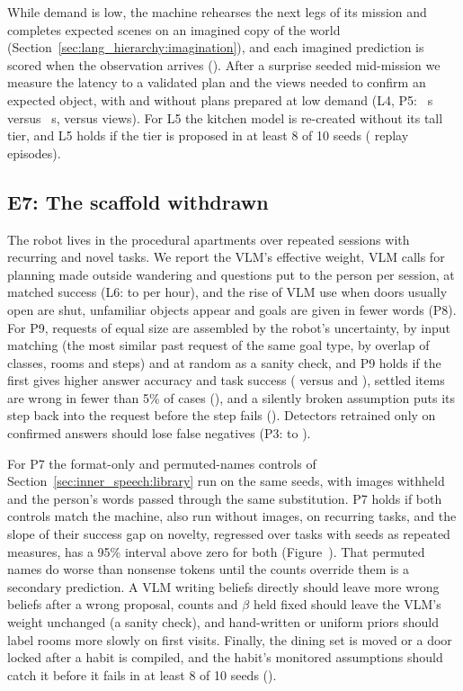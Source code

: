 While demand is low, the machine rehearses the next legs of its mission and completes expected scenes on an imagined
copy of the world (Section~\ref{sec:lang_hierarchy:imagination}), and each imagined prediction is scored when the
observation arrives (\result{--}). After a surprise seeded mid-mission we measure the latency to a validated plan and
the views needed to confirm an expected object, with and without plans prepared at low demand (L4, P5: \result{--}~s
versus \result{--}~s, \result{--} versus \result{--} views). For L5 the kitchen model is re-created without its tall
tier, and L5 holds if the tier is proposed in at least 8 of 10 seeds (\result{--} replay episodes).

\subsection{E7: The scaffold withdrawn}
\label{sec:experiments:e7}

The robot lives in the procedural apartments over repeated sessions with recurring and novel tasks. We report the
VLM's effective weight, VLM calls for planning made outside wandering and questions put to the person per session, at matched success
(L6: \result{--} to \result{--} per hour), and the rise of VLM use when doors usually open are shut, unfamiliar
objects appear and goals are given in fewer words (P8). For P9, requests of equal size are assembled by the robot's
uncertainty, by input matching (the most similar past request of the same goal type, by overlap of classes, rooms and steps)
and at random as a sanity check, and P9 holds if the first gives higher answer accuracy and task
success (\result{--} versus \result{--} and \result{--}), settled items are wrong in fewer than 5\% of cases
(\result{--}), and a silently broken assumption puts its step back into the request before the step fails
(\result{--}). Detectors retrained only on confirmed answers should lose false negatives (P3: \result{--} to
\result{--}).

For P7 the format-only and permuted-names controls of Section~\ref{sec:inner_speech:library} run on the same
seeds, with images withheld and the person's words passed through the same substitution. P7 holds if both controls
match the machine, also run without images, on recurring tasks, and the slope of their success gap on novelty,
regressed over tasks with seeds as repeated measures, has a 95\% interval above zero for both (Figure~\result{--}).
That permuted names do worse than nonsense tokens until the counts override them is a secondary prediction. A VLM writing beliefs directly should leave more wrong
beliefs after a wrong proposal, counts and $\beta$ held fixed should leave the VLM's weight unchanged (a sanity check), and
hand-written or uniform priors should label rooms more slowly on first visits. Finally, the dining set is moved or a door
locked after a habit is compiled, and the habit's monitored assumptions should catch it before it fails in at least 8 of 10
seeds (\result{--}).

